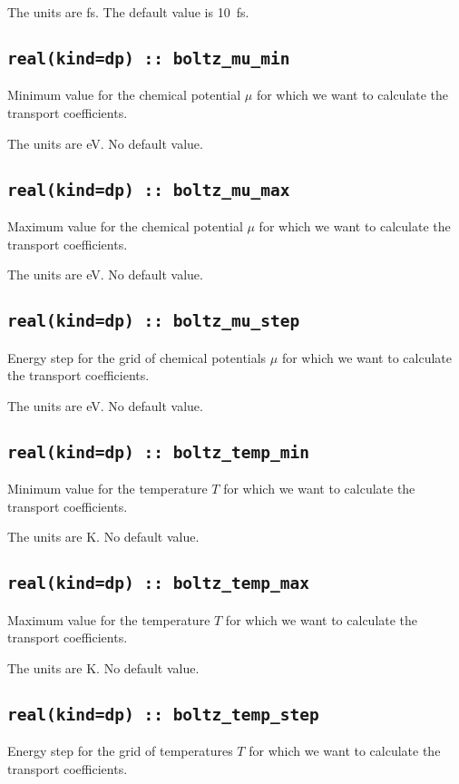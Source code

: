 The units are fs.
The default value is 10~fs.

\subsection[boltz\_mu\_min]{\tt real(kind=dp) :: boltz\_mu\_min}
Minimum value for the chemical potential $\mu$ for which we want to calculate the transport coefficients.

The units are eV.
No default value.

\subsection[boltz\_mu\_max]{\tt real(kind=dp) :: boltz\_mu\_max}
Maximum value for the chemical potential $\mu$ for which we want to calculate the transport coefficients.

The units are eV.
No default value.

\subsection[boltz\_mu\_step]{\tt real(kind=dp) :: boltz\_mu\_step}
Energy step for the grid of chemical potentials $\mu$ for which we want to calculate the transport coefficients.

The units are eV.
No default value.

\subsection[boltz\_temp\_min]{\tt real(kind=dp) :: boltz\_temp\_min}
Minimum value for the temperature $T$ for which we want to calculate the transport coefficients.

The units are K.
No default value.

\subsection[boltz\_temp\_max]{\tt real(kind=dp) :: boltz\_temp\_max}
Maximum value for the temperature $T$ for which we want to calculate the transport coefficients.

The units are K.
No default value.

\subsection[boltz\_temp\_step]{\tt real(kind=dp) :: boltz\_temp\_step}
Energy step for the grid of temperatures $T$ for which we want to calculate the transport coefficients.

